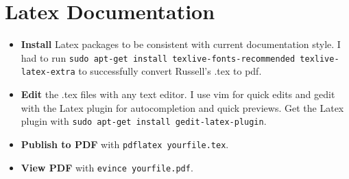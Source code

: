 \documentclass{article}
\begin{document}
	\section{Latex Documentation}
        \begin{itemize} 
			\item \textbf{Install} Latex packages to be consistent with current documentation style. I had to run \texttt{sudo apt-get install texlive-fonts-recommended texlive-latex-extra} to successfully convert Russell's .tex to pdf.
			\item \textbf{Edit} the .tex files with any text editor. I use vim for quick edits and gedit with the Latex plugin for autocompletion and quick previews. Get the Latex plugin with \texttt{sudo apt-get install gedit-latex-plugin}.
            \item \textbf{Publish to PDF} with \texttt{pdflatex yourfile.tex}.
			\item \textbf{View PDF} with \texttt{evince yourfile.pdf}.
		\end{itemize}
\end{document}
